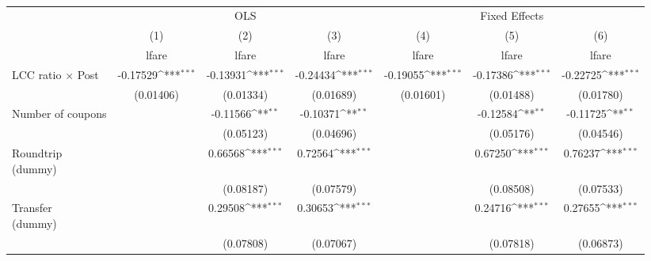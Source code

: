 \begin{table}[htbp]\centering
\def\sym#1{\ifmmode^{#1}\else\(^{#1}\)\fi}
\caption{ \label{asvxfe}}
\begin{tabular}{l*{6}{c}}
\toprule
                    &\multicolumn{3}{c}{OLS}                                          &\multicolumn{3}{c}{Fixed Effects}                                \\\cmidrule(lr){2-4}\cmidrule(lr){5-7}
                    &\multicolumn{1}{c}{(1)}&\multicolumn{1}{c}{(2)}&\multicolumn{1}{c}{(3)}&\multicolumn{1}{c}{(4)}&\multicolumn{1}{c}{(5)}&\multicolumn{1}{c}{(6)}\\
                    &\multicolumn{1}{c}{lfare}&\multicolumn{1}{c}{lfare}&\multicolumn{1}{c}{lfare}&\multicolumn{1}{c}{lfare}&\multicolumn{1}{c}{lfare}&\multicolumn{1}{c}{lfare}\\
\midrule
LCC ratio $\times$ Post&    -0.17529\sym{***}&    -0.13931\sym{***}&    -0.24434\sym{***}&    -0.19055\sym{***}&    -0.17386\sym{***}&    -0.22725\sym{***}\\
                    &   (0.01406)         &   (0.01334)         &   (0.01689)         &   (0.01601)         &   (0.01488)         &   (0.01780)         \\
\addlinespace
Number of coupons   &                     &    -0.11566\sym{**} &    -0.10371\sym{**} &                     &    -0.12584\sym{**} &    -0.11725\sym{**} \\
                    &                     &   (0.05123)         &   (0.04696)         &                     &   (0.05176)         &   (0.04546)         \\
\addlinespace
\shortstack{Roundtrip \\ (dummy)}&                     &     0.66568\sym{***}&     0.72564\sym{***}&                     &     0.67250\sym{***}&     0.76237\sym{***}\\
                    &                     &   (0.08187)         &   (0.07579)         &                     &   (0.08508)         &   (0.07533)         \\
\addlinespace
\shortstack{Transfer \\ (dummy)}&                     &     0.29508\sym{***}&     0.30653\sym{***}&                     &     0.24716\sym{***}&     0.27655\sym{***}\\
                    &                     &   (0.07808)         &   (0.07067)         &                     &   (0.07818)         &   (0.06873)         \\

\end{tabular}
\end{table}

